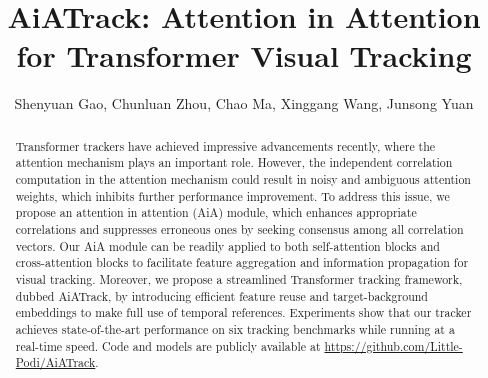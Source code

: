 \documentclass[runningheads]{llncs}
\begin{document}
\pagestyle{headings}
\mainmatter
\def\ECCVSubNumber{1951}  

\title{AiATrack: Attention in Attention for Transformer Visual Tracking} 

\begin{comment}
\titlerunning{ECCV-22 submission ID \ECCVSubNumber} 
\authorrunning{ECCV-22 submission ID \ECCVSubNumber} 
\author{Anonymous ECCV submission}
\institute{Paper ID \ECCVSubNumber}
\end{comment}


\author{Shenyuan Gao, 
Chunluan Zhou, 
Chao Ma, 
Xinggang Wang, 
Junsong Yuan}


\maketitle

\begin{abstract}
Transformer trackers have achieved impressive advancements recently, where the attention mechanism plays an important role. However, the independent correlation computation in the attention mechanism could result in noisy and ambiguous attention weights, which inhibits further performance improvement. To address this issue, we propose an attention in attention (AiA) module, which enhances appropriate correlations and suppresses erroneous ones by seeking consensus among all correlation vectors. Our AiA module can be readily applied to both self-attention blocks and cross-attention blocks to facilitate feature aggregation and information propagation for visual tracking. Moreover, we propose a streamlined Transformer tracking framework, dubbed AiATrack, by introducing efficient feature reuse and target-background embeddings to make full use of temporal references. Experiments show that our tracker achieves state-of-the-art performance on six tracking benchmarks while running at a real-time speed. Code and models are publicly available at \href{https://github.com/Little-Podi/AiATrack}{https://github.com/Little-Podi/AiATrack}.
\end{abstract}
\end{document}
